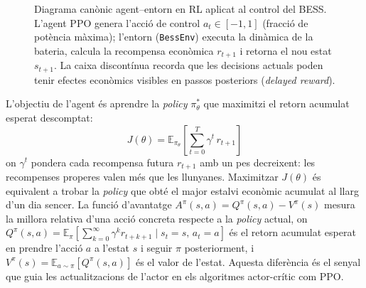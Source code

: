 \documentclass[a4paper,12pt,twoside]{ThesisStyle}
\begin{document}
\begin{figure}[htb]
\centering
{}
\caption{Diagrama canònic agent--entorn en RL aplicat al control del BESS. L'agent PPO genera l'acció de control $a_t \in [-1,1]$ (fracció de potència màxima); l'entorn (\texttt{BessEnv}) executa la dinàmica de la bateria, calcula la recompensa econòmica $r_{t+1}$ i retorna el nou estat $s_{t+1}$. La caixa discontínua recorda que les decisions actuals poden tenir efectes econòmics visibles en passos posteriors (\textit{delayed reward}).}
\label{fig:rl_loop}
\end{figure}

L'objectiu de l'agent és aprendre la \textit{policy} $\pi_\theta^*$ que maximitzi el retorn acumulat esperat descomptat:
\begin{equation}
    J(\theta) = \mathbb{E}_{\pi_\theta}\!\left[\sum_{t=0}^{T} \gamma^t\, r_{t+1}\right]
    \label{eq:retorn}
\end{equation}
on $\gamma^t$ pondera cada recompensa futura $r_{t+1}$ amb un pes decreixent: les recompenses properes valen més que les llunyanes. Maximitzar $J(\theta)$ és equivalent a trobar la \textit{policy} que obté el major estalvi econòmic acumulat al llarg d'un dia sencer.
La funció d'avantatge $A^\pi(s,a) = Q^\pi(s,a) - V^\pi(s)$ mesura la millora relativa d'una acció concreta respecte a la \textit{policy} actual, on $Q^\pi(s,a) = \mathbb{E}_\pi\!\left[\sum_{k=0}^{\infty}\gamma^k r_{t+k+1} \mid s_t=s,\,a_t=a\right]$ és el retorn acumulat esperat en prendre l'acció $a$ a l'estat $s$ i seguir $\pi$ posteriorment, i $V^\pi(s) = \mathbb{E}_{a\sim\pi}[Q^\pi(s,a)]$ és el valor de l'estat. Aquesta diferència és el senyal que guia les actualitzacions de l'actor en els algoritmes actor-crític com PPO.
\end{document}
